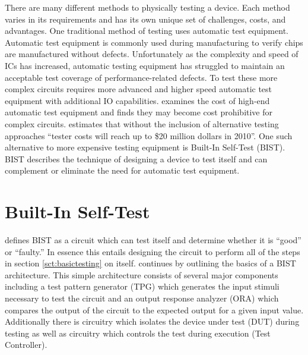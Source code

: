 \documentclass[12pt]{report}
\begin{document}
There are many different methods to physically testing a device.  Each method varies in its requirements and has its own unique set of challenges, costs, and advantages.  One traditional method of testing uses automatic test equipment.  Automatic test equipment is commonly used during manufacturing to verify chips are manufactured without defects\cite{zorian}.  Unfortunately as the complexity and speed of ICs has increased, automatic testing equipment has struggled to maintain an acceptable test coverage of performance-related defects\cite{zorian}.  To test these more complex circuits requires more advanced and higher speed automatic test equipment with additional IO capabilities\cite{zorian}.  \cite{zorian} examines the cost of high-end automatic test equipment and finds they may become cost prohibitive for complex circuits.  \cite{itrs} estimates that without the inclusion of alternative testing approaches ``tester costs will reach up to \$20 million dollars in 2010''. One such alternative to more expensive testing equipment is Built-In Self-Test (BIST). BIST describes the technique of designing a device to test itself\cite{stroud} and can complement or eliminate the need for automatic test equipment\cite{zorian}.

\section{Built-In Self-Test}
\cite{stroud} defines BIST as a circuit which can test itself and determine whether it is ``good'' or ``faulty.''  In essence this entails designing the circuit to perform all of the steps in section \ref{sct:basictesting} on itself.  \cite{stroud} continues by outlining the basics of a BIST architecture.  This simple architecture consists of several major components including a test pattern generator (TPG) which generates the input stimuli necessary to test the circuit and an output response analyzer (ORA) which compares the output of the circuit to the expected output for a given input value.  Additionally there is circuitry which isolates the device under test (DUT) during testing as well as circuitry which controls the test during execution (Test Controller)\cite{stroud}.
\end{document}
